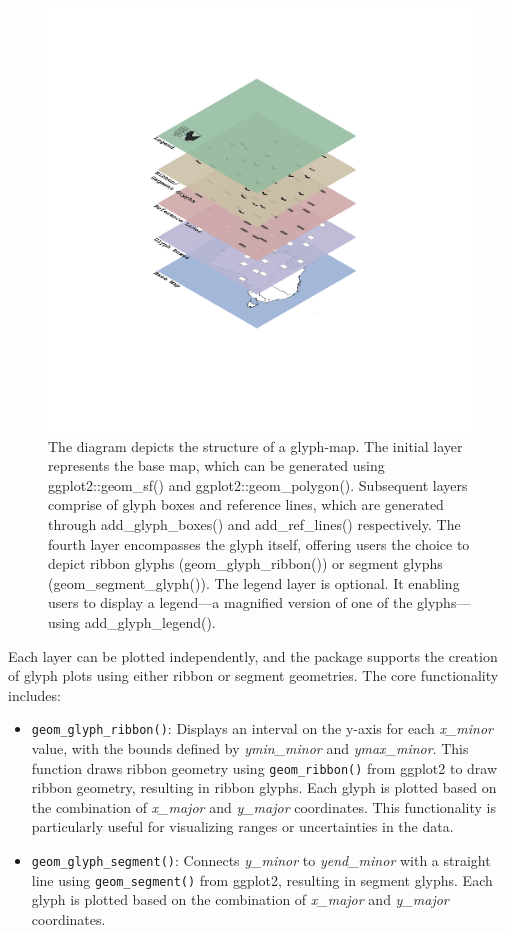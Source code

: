\begin{figure}
\includegraphics[width=49.22in]{figures/glyphmap-layers} \caption{The diagram depicts the structure of a glyph-map. The initial layer represents the base map, which can be generated using ggplot2::geom_sf() and ggplot2::geom_polygon(). Subsequent layers comprise of glyph boxes and reference lines, which are generated through add_glyph_boxes() and add_ref_lines() respectively. The fourth layer encompasses the glyph itself, offering users the choice to depict ribbon glyphs (geom_glyph_ribbon()) or segment glyphs (geom_segment_glyph()). The legend layer is optional. It enabling users to display a legend—a magnified version of one of the glyphs—using add_glyph_legend().}\label{fig:unnamed-chunk-1}
\end{figure}

Each layer can be plotted independently, and the package supports the creation of glyph plots using either ribbon or segment geometries. The core functionality includes:

\begin{itemize}
\item
  \texttt{geom\_glyph\_ribbon()}: Displays an interval on the y-axis for each \emph{x\_minor} value, with the bounds defined by \emph{ymin\_minor} and \emph{ymax\_minor}. This function draws ribbon geometry using \texttt{geom\_ribbon()} from ggplot2 to draw ribbon geometry, resulting in ribbon glyphs. Each glyph is plotted based on the combination of \emph{x\_major} and \emph{y\_major} coordinates. This functionality is particularly useful for visualizing ranges or uncertainties in the data.
\item
  \texttt{geom\_glyph\_segment()}: Connects \emph{y\_minor} to \emph{yend\_minor} with a straight line using \texttt{geom\_segment()} from ggplot2, resulting in segment glyphs. Each glyph is plotted based on the combination of \emph{x\_major} and \emph{y\_major} coordinates.
\end{itemize}

